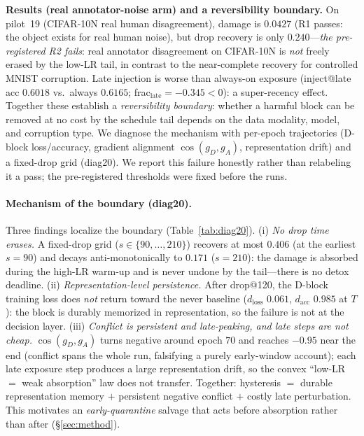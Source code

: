 \documentclass{article}
\begin{document}
\textbf{Results (real annotator-noise arm) and a reversibility boundary.}
On pilot~19 (CIFAR-10N real human disagreement), damage is $0.0427$ (R1 passes: the object
exists for real human noise), but drop recovery is only $0.240$---\emph{the pre-registered R2
fails}: real annotator disagreement on CIFAR-10N is \emph{not} freely erased by the low-LR tail,
in contrast to the near-complete recovery for controlled MNIST corruption. Late injection is
worse than always-on exposure (inject@late acc $0.6018$ vs.\ always $0.6165$; frac$_{\text{late}}
=-0.345<0$): a super-recency effect. Together these establish a \emph{reversibility boundary}:
whether a harmful block can be removed at no cost by the schedule tail depends on the data
modality, model, and corruption type. We diagnose the mechanism with per-epoch trajectories
(D-block loss/accuracy, gradient alignment $\cos(g_D,g_A)$, representation drift) and a
fixed-drop grid (diag20). We report this failure honestly rather than relabeling it a pass; the
pre-registered thresholds were fixed before the runs.

\paragraph{Mechanism of the boundary (diag20).} Three findings localize the boundary
(Table~\ref{tab:diag20}).
(i) \emph{No drop time erases.} A fixed-drop grid ($s\in\{90,\dots,210\}$) recovers at most
$0.406$ (at the earliest $s{=}90$) and decays anti-monotonically to $0.171$ ($s{=}210$): the
damage is absorbed during the high-LR warm-up and is never undone by the tail---there is no
detox deadline. (ii) \emph{Representation-level persistence.} After drop@120, the D-block
training loss does \emph{not} return toward the never baseline ($d_{\text{loss}}$ $0.061$,
$d_{\text{acc}}$ $0.985$ at $T$): the block is durably memorized in representation, so the
failure is not at the decision layer. (iii) \emph{Conflict is persistent and late-peaking, and
late steps are not cheap.} $\cos(g_D,g_A)$ turns negative around epoch $70$ and reaches $-0.95$
near the end (conflict spans the whole run, falsifying a purely early-window account); each
late exposure step produces a large representation drift, so the convex ``low-LR $=$ weak
absorption'' law does not transfer. Together: hysteresis $=$ durable representation memory $+$
persistent negative conflict $+$ costly late perturbation. This motivates an
\emph{early-quarantine} salvage that acts before absorption rather than after
(\S\ref{sec:method}).
\end{document}
